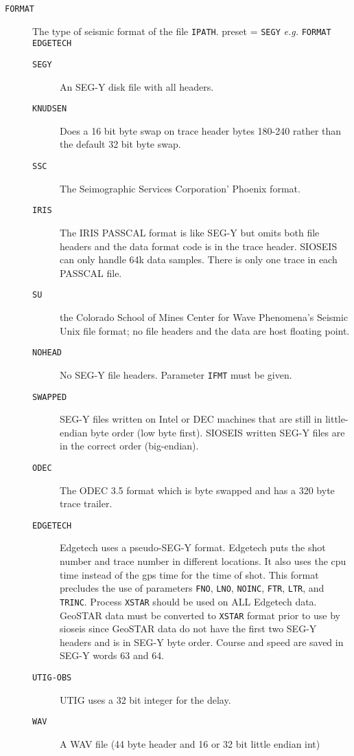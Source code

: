 \begin{description}
\item[\texttt{FORMAT}] The type of seismic format of the file \texttt{IPATH}.  \Gls{preset} = \texttt{SEGY}           \textit{e.g.} \texttt{FORMAT EDGETECH}
    \begin{description}
        \item[\texttt{SEGY}]   An SEG-Y disk file with all headers.
        \item[\texttt{KNUDSEN}]   Does a 16 bit byte swap on trace header bytes 180-240 rather than the default 32 bit byte swap.
        \item[\texttt{SSC}] The Seimographic Services Corporation' Phoenix format.
        \item[\texttt{IRIS}]  The IRIS PASSCAL format is like SEG-Y but omits both file headers and the data format code is in the trace header.  SIOSEIS can only handle 64k data samples.  There is only one trace in each PASSCAL file.
        \item[\texttt{SU}]  the Colorado School of Mines Center for Wave Phenomena's Seismic Unix file format; no file headers and the data are host floating point.
        \item[\texttt{NOHEAD}]  No SEG-Y file headers.  Parameter \texttt{IFMT} must be given.
        \item[\texttt{SWAPPED}]  SEG-Y files written on Intel or DEC machines that are still in little-endian byte order (low byte first). SIOSEIS written SEG-Y files are in the correct order (big-endian).
        \item[\texttt{ODEC}]  The ODEC 3.5 format which is byte swapped and has a 320 byte trace trailer.
        \item[\texttt{EDGETECH}]   Edgetech uses a pseudo-SEG-Y format.  Edgetech puts the \gls{shot} number and trace number in different locations.  It also uses the cpu time instead of the \gls{gps} time for the time of \gls{shot}.  This format precludes the use of parameters \texttt{FNO}, \texttt{LNO}, \texttt{NOINC}, \texttt{FTR}, \texttt{LTR}, and \texttt{TRINC}.  Process \texttt{XSTAR} should be used on ALL Edgetech data.  GeoSTAR data must be converted to \texttt{XSTAR} format prior to use by sioseis since GeoSTAR data do not have the first two SEG-Y headers and is in SEG-Y byte order.  Course and speed are saved in SEG-Y words 63 and 64.
        \item[\texttt{UTIG-OBS}]   UTIG uses a 32 bit integer for the delay.
        \item[\texttt{WAV}]   A WAV file (44 byte header and 16 or 32 bit little endian int)

\end{description}
\end{description}
